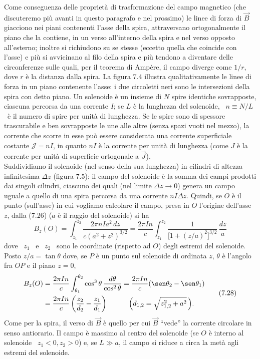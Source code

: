 Come conseguenza delle propriet\`a di trasformazione del campo magnetico (che
discuteremo pi\`u avanti in questo paragrafo e nel prossimo) le linee di forza
di $\vec B$ giacciono nei piani contenenti l'asse della spira, attraversano
ortogonalmente il piano che la contiene, in un verso all'interno della spira e
nel verso opposto all'esterno; inoltre si richiudono su se stesse (eccetto
quella che coincide con l'asse) e pi\`u si avvicinano al filo della spira e
pi\`u tendono a diventare delle circonferenze sulle quali, per il teorema di
Amp\`ere, il campo diverge come $1/r$, dove $r$ \`e la distanza dalla spira. La
figura 7.4 illustra qualitativamente le linee di forza in un piano contenente
l'asse: i due circoletti neri sono le intersezioni della spira con detto piano.
Un solenoide \`e un insieme di $N$ spire identiche sovrapposte, ciascuna
percorsa da una corrente $I$; se $L$ \`e la lunghezza del solenoide,
\ $n\equiv N/L$ \ \`e il numero di spire per unit\`a di lunghezza.
Se le spire sono di spessore trascurabile e ben sovrapposte le une alle altre
(senza spazi vuoti nel mezzo), la corrente che scorre in esse pu\`o essere
considerata una corrente superficiale costante $\mathcal J=nI$, in quanto $nI$
\`e la corrente per unit\`a di lunghezza (come $J$ \`e la corrente per unit\`a
di superficie ortogonale a $\vec J$).\\
Suddividiamo il solenoide (nel senso della sua lunghezza) in cilindri di altezza
infinitesima $\Delta z$ (figura 7.5): il campo del solenoide \`e la somma dei
campi prodotti dai singoli cilindri, ciascuno dei quali (nel limite
$\Delta z\to0$) genera un campo uguale a quello di una spira percorsa da una
corrente $nI\Delta z$.
Quindi, se $O$ \`e il punto (sull'asse) in cui vogliamo calcolare il campo,
presa in $O$ l'origine dell'asse $z$, dalla (7.26) ($a$ \`e il raggio del
solenoide) si ha
\begin{equation}
  B_z(O)=\int_{z_1}^{z_2}\frac{2\pi nIa^2\,dz}{c(a^2+z^2)^{3/2}}
  =\frac{2\pi In}{c}\int_{z_1}^{z_2}
  \frac{1}{\big[1+(z/a)^2\big]^{3/2}}\,\frac{dz}{a}
  \tag{7.27}
\end{equation}
dove \ $z_1$ \ e \ $z_2$ \ sono le coordinate (rispetto ad $O$) degli estremi
del solenoide. Posto $z/a=\tan\theta$ dove, se $P$ \`e un punto sul solenoide di
ordinata $z$, $\theta$ \`e l'angolo fra $OP$ e il piano $z=0$,
\begin{equation}
  \begin{aligned}
    B_z(O)&=\frac{2\pi In}{c}\int_{\theta_1}^{\theta_2}
    \cos^3\theta\,\frac{d\theta}{\cos^2\theta}
    =\frac{2\pi In}{c}(\sen\theta_2-\sen\theta_1)\\
    &=\frac{2\pi In}{c}\left(\frac{z_2}{d_2}-\frac{z_1}{d_1}\right)
    \qquad\quad\Big(d_{1,2}=\sqrt{z_{1,2}^2+a^2}\,\Big).
  \end{aligned}
  \tag{7.28}
\end{equation}
Come per la spira, il verso di $\vec B$ \`e quello per cui $\vec B$ ``vede'' la
corrente circolare in senso antiorario. Il campo \`e massimo al centro del
solenoide (se $O$ \`e interno al solenoide \ $z_1<0,z_2>0$) e, se $L\gg a$, il
campo si riduce a circa la met\`a agli estremi del solenoide.


